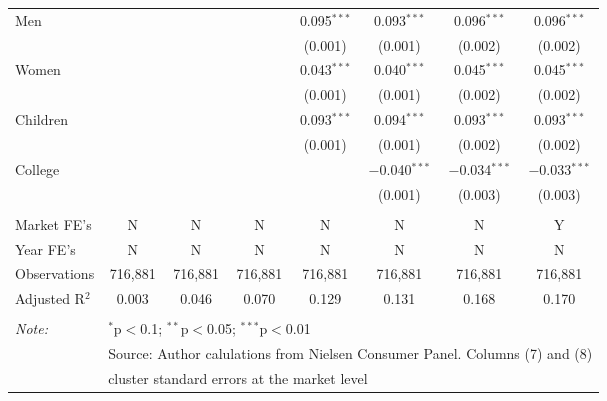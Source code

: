\begin{table}[!htbp]
\begin{tabular}{@{\extracolsep{5pt}}lccccccc}
  Men &  &  &  & 0.095$^{***}$ & 0.093$^{***}$ & 0.096$^{***}$ & 0.096$^{***}$ \\ 
  &  &  &  & (0.001) & (0.001) & (0.002) & (0.002) \\ 
  Women &  &  &  & 0.043$^{***}$ & 0.040$^{***}$ & 0.045$^{***}$ & 0.045$^{***}$ \\ 
  &  &  &  & (0.001) & (0.001) & (0.002) & (0.002) \\ 
  Children &  &  &  & 0.093$^{***}$ & 0.094$^{***}$ & 0.093$^{***}$ & 0.093$^{***}$ \\ 
  &  &  &  & (0.001) & (0.001) & (0.002) & (0.002) \\ 
  College &  &  &  &  & $-$0.040$^{***}$ & $-$0.034$^{***}$ & $-$0.033$^{***}$ \\ 
  &  &  &  &  & (0.001) & (0.003) & (0.003) \\ 
 \hline \\[-1.8ex] 
Market FE's & N & N & N & N & N & N & Y \\ 
Year FE's & N & N & N & N & N & N & N \\ 
Observations & 716,881 & 716,881 & 716,881 & 716,881 & 716,881 & 716,881 & 716,881 \\ 
Adjusted R$^{2}$ & 0.003 & 0.046 & 0.070 & 0.129 & 0.131 & 0.168 & 0.170 \\ 
\hline 
\hline \\[-1.8ex] 
\textit{Note:}  & \multicolumn{7}{l}{$^{*}$p$<$0.1; $^{**}$p$<$0.05; $^{***}$p$<$0.01} \\ 
 & \multicolumn{7}{l}{Source: Author calulations from Nielsen Consumer Panel. Columns (7) and (8) } \\ 
 & \multicolumn{7}{l}{cluster standard errors at the market level} \\ 
\end{tabular} 
\end{table} 
